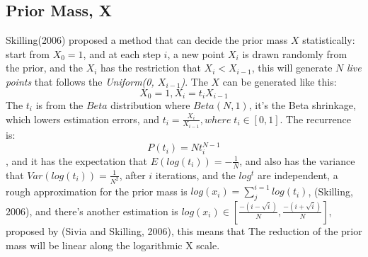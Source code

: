 \documentclass[11pt]{book}
\begin{document}
\subsection{Prior Mass, X}
Skilling(2006) proposed a method that can decide the prior mass $X$ statistically:
start from $X_0 = 1$, and at each step $i$, a new point $X_i$ is drawn randomly from the prior, 
and the $X_i$ has the restriction that $X_i < X_{i-1}$, this will generate $N$ \textit{live points} that follows the 
 \textit{Uniform(0, $X_{i-1}$)}. The $X$ can be generated like this:
 \begin{equation}
	 X_0 = 1, X_i = t_iX_{i-1}
 \end{equation}
 The $t_i$ is from the $Beta$ distribution where $Beta(N, 1)$, 
 it's the Beta shrinkage, which lowers estimation errors,
 and $t_i = \frac{X_i}{X_{i-1}}, where \;  t_i \in [0,1]$. 
 The recurrence is:
 \begin{equation}
	P(t_i) = Nt^{N-1}_i
 \end{equation}, and it has the expectation that $E(log(t_i)) = -\frac{1}{N}$, 
 and also has the variance that $Var(log(t_i)) = \frac{1}{N^2}$, after $i$ iterations, 
 and the $log^t$ are independent, a rough approximation for the prior mass is $log(x_i) = \sum_{j}^{i=1}log(t_i)$, (Skilling, 2006), 
 and there's another estimation is  $log(x_i) \in [\frac{-(i-\sqrt{i})}{N}, \frac{-(i+\sqrt{i})}{N}]$, proposed by (Sivia and Skilling, 2006),
 this means that The reduction of the prior mass 
 will be linear along the logarithmic X scale.
\end{document}
